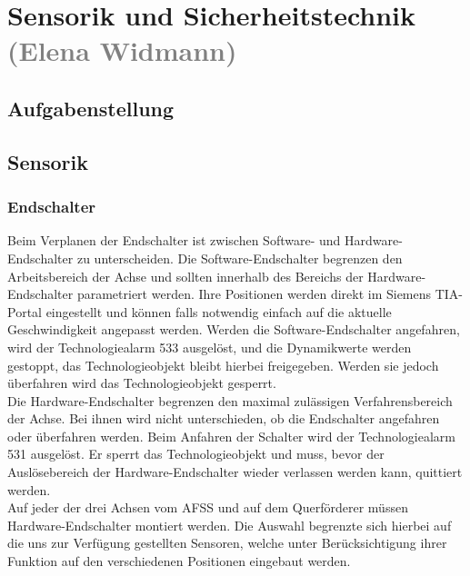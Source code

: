 \section{Sensorik und Sicherheitstechnik \textcolor{gray}{(Elena Widmann)}}

\subsection{Aufgabenstellung}

\subsection{Sensorik}

\subsubsection{Endschalter}
Beim Verplanen der Endschalter ist zwischen Software- und Hardware-Endschalter zu unterscheiden. Die Software-Endschalter begrenzen den Arbeitsbereich der Achse und sollten innerhalb des Bereichs der Hardware-Endschalter parametriert werden. Ihre Positionen werden direkt im Siemens TIA-Portal eingestellt und können falls notwendig einfach auf die aktuelle Geschwindigkeit angepasst werden. Werden die Software-Endschalter angefahren, wird der Technologiealarm 533 ausgelöst, und die Dynamikwerte werden gestoppt, das Technologieobjekt bleibt hierbei freigegeben. Werden sie jedoch überfahren wird das Technologieobjekt gesperrt. \\
Die Hardware-Endschalter begrenzen den maximal zulässigen Verfahrensbereich der Achse. Bei ihnen wird nicht unterschieden, ob die Endschalter angefahren oder überfahren werden. Beim Anfahren der Schalter wird der Technologiealarm 531 ausgelöst. Er sperrt das Technologieobjekt und muss, bevor der Auslösebereich der Hardware-Endschalter wieder verlassen werden kann, quittiert werden. \cite{axis_manual}\\
Auf jeder der drei Achsen vom AFSS und auf dem Querförderer müssen Hardware-Endschalter montiert werden. Die Auswahl begrenzte sich hierbei auf die uns zur Verfügung gestellten Sensoren, welche unter Berücksichtigung ihrer Funktion auf den verschiedenen Positionen eingebaut werden.

